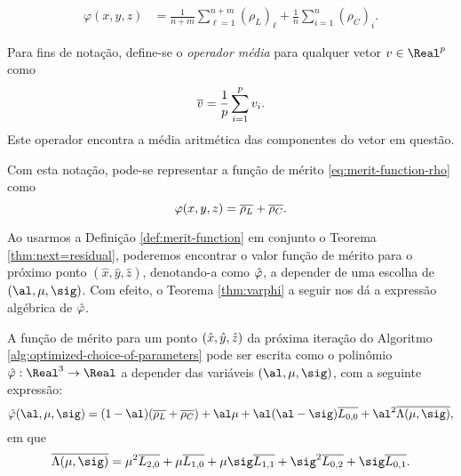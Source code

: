 \begin{align}
\varphi(x,y,z) & = \frac{1}{n+m}\sum_{\ell=1}^{n+m}(\rho_L)_\ell+ 
\frac{1}{n}\sum_{i=1}^{n}(\rho_C)_i.\label{eq:merit-function-rho}
\end{align}

Para fins de notação, define-se o \emph{operador média} para qualquer vetor
$v\in\Real^p$ como \[\overline{v} = \frac{1}{p}\sum_{i=1}^p v_i.\] Este operador
encontra a média aritmética das componentes do vetor em questão. 

Com esta notação, pode-se representar a função de mérito
\eqref{eq:merit-function-rho} como
\begin{equation}\label{eq:merit-function-as-sum-bar}
\varphi(x,y,z)  = \overline{\rho_L}+ 
\overline{\rho_C}.
\end{equation}



Ao usarmos a Definição \ref{def:merit-function} em conjunto o Teorema \ref{thm:next=residual}, poderemos encontrar o valor função de mérito para o próximo ponto $(\hat{x},\hat{y},\hat{z})$, denotando-a como $\hat{\varphi}$, a depender de uma
escolha de $(\al,\mu,\sig)$. Com efeito, o Teorema \ref{thm:varphi} a seguir nos dá a expressão algébrica de $\hat{\varphi}$.

\begin{teo}
\label{thm:varphi}  
A função de mérito para um ponto $(\hat{x},\hat{y},\hat{z})$ da próxima iteração do Algoritmo \ref{alg:optimized-choice-of-parameters} pode ser escrita como o {polinômio} 
$\nextphi:\Real^3\to\Real$ a depender das variáveis $(\al,\mu,\sig)$, com a seguinte
expressão:
\begin{equation}
\label{eq:merit-function-al-mu-sig}
\nextphi(\al,\mu,\sig) = (1-\al)(\dbvec{\rho_L} +
\dbvec{\rho_C}) + \al\mu + \al(\al-\sig)\dbvec{L_{0,0}} +
\al^2\dbvec{\Lambda(\mu,\sig)},
\end{equation}
em que 
\begin{equation}
	\label{eq:Lambda-mu-sig}
	\dbvec{\Lambda(\mu,\sig)} = \mu^2
 \dbvec{L_{2,0}} + \mu \dbvec{L_{1,0}} + 	\mu \sig \dbvec{L_{1,1}} +
 \sig^2 \dbvec{L_{0,2}} + \sig \dbvec{L_{0,1}}.
 \end{equation} 
 
  \end{teo}

